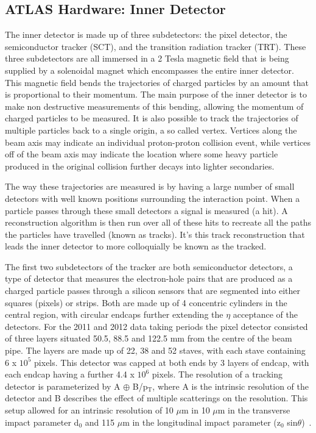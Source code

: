 \subsection{ATLAS Hardware: Inner Detector}

The inner detector is made up of three subdetectors: the pixel detector, the semiconductor tracker (SCT), and the transition radiation tracker (TRT).  
These three subdetectors are all immersed in a 2 Tesla magnetic field that is being supplied by a solenoidal magnet which encompasses the entire inner detector.  
This magnetic field bends the trajectories of charged particles by an amount that is proportional to their momentum.  
The main purpose of the inner detector is to make non destructive measurements of this bending, allowing the momentum of charged particles to be measured.  
It is also possible to track the trajectories of multiple particles back to a single origin, a so called vertex.  
Vertices along the beam axis may indicate an individual proton-proton collision event, while vertices off of the beam axis may indicate the location where some heavy particle produced in the original collision further decays into lighter secondaries.  
 
The way these trajectories are measured is by having a large number of small detectors with well known positions surrounding the interaction point.  
When a particle passes through these small detectors a signal is measured (a hit).  
A reconstruction algorithm is then run over all of these hits to recreate all the paths the particles have travelled (known as tracks).  
It's this track reconstruction that leads the inner detector to more colloquially be known as the tracked.  

The first two subdetectors of the tracker are both semiconductor detectors, a type of detector that measures the electron-hole pairs that are produced as a charged particle passes through a silicon sensors that are segmented into either squares (pixels) or strips.  
Both are made up of 4 concentric cylinders in the central region, with circular endcaps further extending the $\eta$ acceptance of the detectors.  
For the 2011 and 2012 data taking periods the pixel detector consisted of three layers situated 50.5, 88.5 and 122.5 mm from the centre of the beam pipe.  
The layers are made up of 22, 38 and 52 staves, with each stave containing 6 x $10^5$ pixels.  
This detector was capped at both ends by 3 layers of endcap, with each endcap having a further 4.4 x $10^6$ pixels.  
The resolution of a tracking detector is parameterized by A $\oplus$ B/p$_{\mathrm{T}}$, where A is the intrinsic resolution of the detector and B describes the effect of multiple scatterings on the resolution.  
This setup allowed for an intrinsic resolution of 10 $\mu$m in 10 $\mu$m in the transverse impact parameter d$_{0}$ and 115 $\mu$m in the longitudinal impact parameter (z$_{0}$ sin$\theta$)~\cite{ID3}.  


